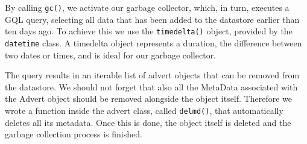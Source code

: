 By calling \texttt{gc()}, we activate our garbage collector, which, in turn,
executes a GQL query, selecting all data that has been added to the datastore
earlier than ten days ago. To achieve this we use the \texttt{timedelta()}
object, provided by the \texttt{datetime} class. A timedelta object
represents a duration, the difference between two dates or times, and is ideal
for our garbage collector.

The query results in an iterable list of advert objects that can be removed
from the datastore. We should not forget that also all the MetaData
associated with the Advert object should be removed alongside the object itself.
Therefore we wrote a function inside the advert class, called \texttt{delmd()},
that automatically deletes all its metadata. Once this is done, the object
itself is deleted and the garbage collection process is finished.





